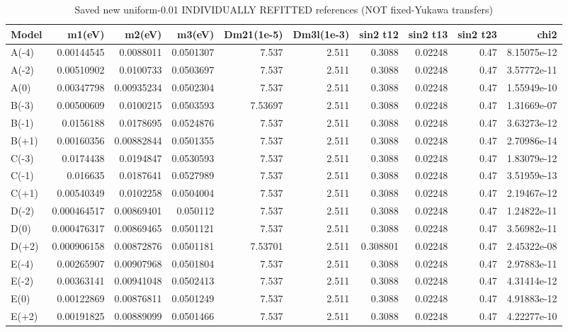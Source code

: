 \begin{table}[htbp]
\centering
\small
\caption{Saved new uniform-0.01 INDIVIDUALLY REFITTED references (NOT fixed-Yukawa transfers)}
\label{tab:table_R0_individually_refitted}
\begin{tabular}{lrrrrrrrrr}
\hline
Model & m1(eV) & m2(eV) & m3(eV) & Dm21(1e-5) & Dm3l(1e-3) & sin2 t12 & sin2 t13 & sin2 t23 & chi2 \\
\hline
A(-4) & 0.00144545 & 0.0088011 & 0.0501307 & 7.537 & 2.511 & 0.3088 & 0.02248 & 0.47 & 8.15075e-12 \\
A(-2) & 0.00510902 & 0.0100733 & 0.0503697 & 7.537 & 2.511 & 0.3088 & 0.02248 & 0.47 & 3.57772e-11 \\
A(0) & 0.00347798 & 0.00935234 & 0.0502304 & 7.537 & 2.511 & 0.3088 & 0.02248 & 0.47 & 1.55949e-10 \\
B(-3) & 0.00500609 & 0.0100215 & 0.0503593 & 7.53697 & 2.511 & 0.3088 & 0.02248 & 0.47 & 1.31669e-07 \\
B(-1) & 0.0156188 & 0.0178695 & 0.0524876 & 7.537 & 2.511 & 0.3088 & 0.02248 & 0.47 & 3.63273e-12 \\
B(+1) & 0.00160356 & 0.00882844 & 0.0501355 & 7.537 & 2.511 & 0.3088 & 0.02248 & 0.47 & 2.70986e-14 \\
C(-3) & 0.0174438 & 0.0194847 & 0.0530593 & 7.537 & 2.511 & 0.3088 & 0.02248 & 0.47 & 1.83079e-12 \\
C(-1) & 0.016635 & 0.0187641 & 0.0527989 & 7.537 & 2.511 & 0.3088 & 0.02248 & 0.47 & 3.51959e-13 \\
C(+1) & 0.00540349 & 0.0102258 & 0.0504004 & 7.537 & 2.511 & 0.3088 & 0.02248 & 0.47 & 2.19467e-12 \\
D(-2) & 0.000464517 & 0.00869401 & 0.050112 & 7.537 & 2.511 & 0.3088 & 0.02248 & 0.47 & 1.24822e-11 \\
D(0) & 0.000476317 & 0.00869465 & 0.0501121 & 7.537 & 2.511 & 0.3088 & 0.02248 & 0.47 & 3.56982e-11 \\
D(+2) & 0.000906158 & 0.00872876 & 0.0501181 & 7.53701 & 2.511 & 0.308801 & 0.02248 & 0.47 & 2.45322e-08 \\
E(-4) & 0.00265907 & 0.00907968 & 0.0501804 & 7.537 & 2.511 & 0.3088 & 0.02248 & 0.47 & 2.97883e-11 \\
E(-2) & 0.00363141 & 0.00941048 & 0.0502413 & 7.537 & 2.511 & 0.3088 & 0.02248 & 0.47 & 4.31414e-12 \\
E(0) & 0.00122869 & 0.00876811 & 0.0501249 & 7.537 & 2.511 & 0.3088 & 0.02248 & 0.47 & 4.91883e-12 \\
E(+2) & 0.00191825 & 0.00889099 & 0.0501466 & 7.537 & 2.511 & 0.3088 & 0.02248 & 0.47 & 4.22277e-10 \\
\hline
\end{tabular}
\end{table}
